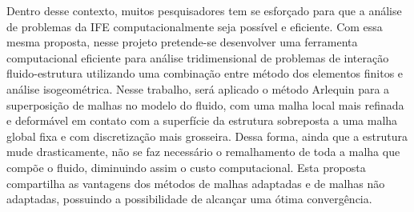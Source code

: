 \documentclass[tese_patricia.tex]{subfiles}
\begin{document}
Dentro desse contexto, muitos pesquisadores tem se esforçado para que a análise de problemas da IFE computacionalmente seja possível e eficiente. Com essa mesma proposta, nesse projeto pretende-se desenvolver uma ferramenta computacional eficiente para análise tridimensional de problemas de interação fluido-estrutura utilizando uma combinação entre método dos elementos finitos e análise isogeométrica.  Nesse trabalho, será aplicado o método Arlequin para a superposição de malhas no modelo do fluido, com uma malha local mais refinada e deformável em contato com a superfície da estrutura sobreposta a uma malha global fixa e com discretização mais grosseira. Dessa forma, ainda que a estrutura mude drasticamente, não se faz necessário o remalhamento de toda a malha que compõe o fluido, diminuindo assim o custo computacional. Esta proposta compartilha as vantagens dos métodos de malhas adaptadas e de malhas não adaptadas, possuindo a possibilidade de alcançar uma ótima convergência.

%
%
\end{document}
